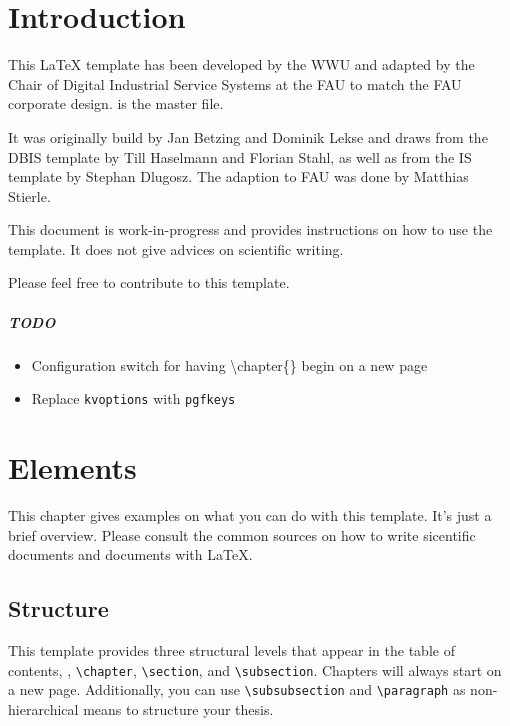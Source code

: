 
\chapter{Introduction}
This \LaTeX \- template has been developed by the \gls{WWU} and adapted by the Chair of Digital Industrial Service Systems at the FAU to match the FAU corporate design.  is the master file.

It was originally build by  Jan Betzing and Dominik Lekse and draws from the DBIS template by Till Haselmann and Florian Stahl, as well as from the IS template by Stephan Dlugosz. The adaption to FAU was done by Matthias Stierle.

This document is work-in-progress and provides instructions on how to use the template. It does not give advices on scientific writing.

Please feel free to contribute to this template.

\paragraph{TODO}
\begin{itemize}
	\item Configuration switch for having \textbackslash chapter\{\} begin on a new page
	\item Replace \texttt{kvoptions} with \texttt{pgfkeys}
\end{itemize}
\chapter{Elements}
This chapter gives examples on what you can do with this template. It's just a brief overview. Please consult the common sources on how to write sicentific documents and documents with \LaTeX.

\section{Structure}
This template provides three structural levels that appear in the table of contents, \viz, \texttt{\textbackslash chapter}, \texttt{\textbackslash section}, and \texttt{\textbackslash subsection}. Chapters will always start on a new page. Additionally, you can use \texttt{\textbackslash subsubsection} and \texttt{\textbackslash paragraph} as non-hierarchical means to structure your thesis.



